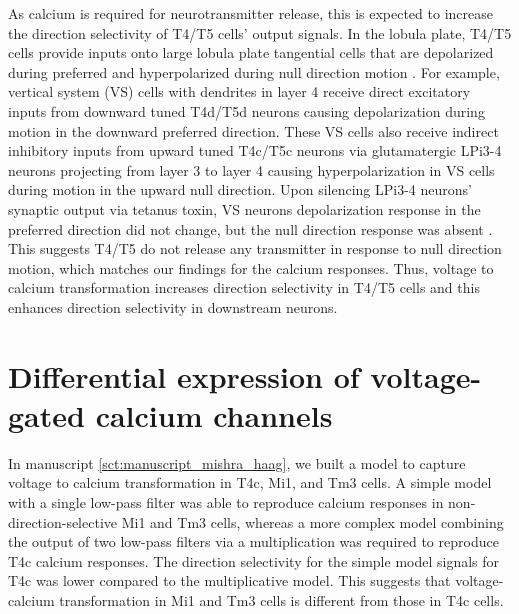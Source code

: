 As calcium is required for neurotransmitter release, this is expected to increase the direction selectivity of T4/T5 cells' output signals. In the lobula plate, T4/T5 cells provide inputs onto large lobula plate tangential cells that are depolarized during preferred and hyperpolarized during null direction motion \parencite{Mauss2014}. For example, vertical system (VS) cells with dendrites in layer 4 receive direct excitatory inputs from downward tuned T4d/T5d neurons causing depolarization during motion in the downward preferred direction. These VS cells also receive indirect inhibitory inputs from upward tuned T4c/T5c neurons via glutamatergic LPi3-4 neurons projecting from layer 3 to layer 4 causing hyperpolarization in VS cells during motion in the upward null direction. Upon silencing LPi3-4 neurons’ synaptic output via tetanus toxin, VS neurons depolarization response in the preferred direction did not change, but the null direction response was absent \parencite{Mauss2015}. This suggests T4/T5 do not release any transmitter in response to null direction motion, which matches our findings for the calcium responses. Thus, voltage to calcium transformation increases direction selectivity in T4/T5 cells and this enhances direction selectivity in downstream neurons. 

\section{Differential expression of voltage-gated calcium channels}

In manuscript \ref{sct:manuscript_mishra_haag}, we built a model to capture voltage to calcium transformation in T4c, Mi1, and Tm3 cells. A simple model with a single low-pass filter was able to reproduce calcium responses in non-direction-selective Mi1 and Tm3 cells, whereas a more complex model combining the output of two low-pass filters via a multiplication was required to reproduce T4c calcium responses. The direction selectivity for the simple model signals for T4c was lower compared to the multiplicative model. This suggests that voltage-calcium transformation in Mi1 and Tm3 cells is different from those in T4c cells. 

